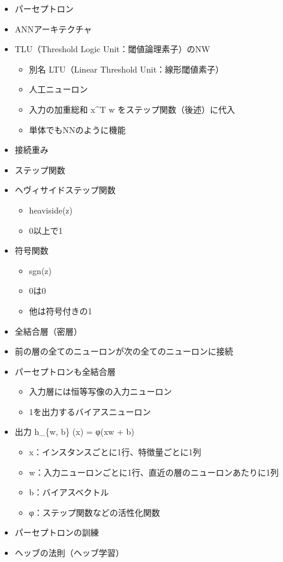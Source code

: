 \begin{itemize}
\item
  パーセプトロン
\item
  ANNアーキテクチャ
\item
  TLU（Threshold Logic Unit：閾値論理素子）のNW

  \begin{itemize}
  \tightlist
  \item
    別名 LTU（Linear Threshold Unit：線形閾値素子）
  \item
    人工ニューロン
  \item
    入力の加重総和 x\^{}T w をステップ関数（後述）に代入
  \item
    単体でもNNのように機能
  \end{itemize}
\item
  接続重み
\item
  ステップ関数
\item
  ヘヴィサイドステップ関数

  \begin{itemize}
  \tightlist
  \item
    heaviside(z)
  \item
    0以上で1
  \end{itemize}
\item
  符号関数

  \begin{itemize}
  \tightlist
  \item
    sgn(z)
  \item
    0は0
  \item
    他は符号付きの1
  \end{itemize}
\item
  全結合層（密層）
\item
  前の層の全てのニューロンが次の全てのニューロンに接続
\item
  パーセプトロンも全結合層

  \begin{itemize}
  \tightlist
  \item
    入力層には恒等写像の入力ニューロン
  \item
    1を出力するバイアスニューロン
  \end{itemize}
\item
  出力 h\_\{w, b\} (x) = φ(xw + b)

  \begin{itemize}
  \tightlist
  \item
    x：インスタンスごとに1行、特徴量ごとに1列
  \item
    w：入力ニューロンごとに1行、直近の層のニューロンあたりに1列
  \item
    b：バイアスベクトル
  \item
    φ：ステップ関数などの活性化関数
  \end{itemize}
\item
  パーセプトロンの訓練
\item
  ヘッブの法則（ヘッブ学習）


\end{itemize}
